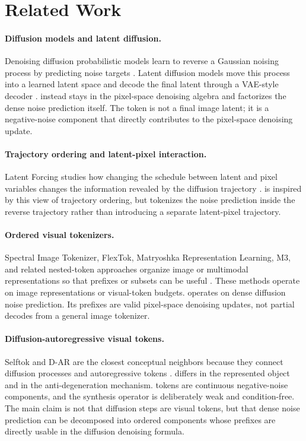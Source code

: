 \section{Related Work}

\paragraph{Diffusion models and latent diffusion.}
Denoising diffusion probabilistic models learn to reverse a Gaussian noising
process by predicting noise targets \citep{ho2020denoising}. Latent diffusion
models move this process into a learned latent space and decode the final latent
through a VAE-style decoder \citep{rombach2022latentdiffusion}. \method{}
instead stays in the pixel-space denoising algebra and factorizes the dense
noise prediction itself. The \method{} token is not a final image latent; it is a
negative-noise component that directly contributes to the pixel-space
denoising update.

\paragraph{Trajectory ordering and latent-pixel interaction.}
Latent Forcing studies how changing the schedule between latent and pixel
variables changes the information revealed by the diffusion trajectory
\citep{baade2026latentforcing}. \method{} is inspired by this view of trajectory
ordering, but tokenizes the noise prediction inside the reverse trajectory
rather than introducing a separate latent-pixel trajectory.

\paragraph{Ordered visual tokenizers.}
Spectral Image Tokenizer, FlexTok, Matryoshka Representation Learning, M3, and
related nested-token approaches organize image or multimodal representations so
that prefixes or subsets can be useful
\citep{esteves2025spectral,bachmann2025flextok,kusupati2024matryoshka,cai2024matryoshkamultimodal}.
These methods operate on image representations or visual-token budgets.
\method{} operates on dense diffusion noise prediction. Its prefixes are valid
pixel-space denoising updates, not partial decodes from a general image
tokenizer.

\paragraph{Diffusion-autoregressive visual tokens.}
Selftok and D-AR are the closest conceptual neighbors because they connect
diffusion processes and autoregressive tokens \citep{wang2025selftok,gao2025dar}.
\method{} differs in the represented object and in the anti-degeneration
mechanism. \method{} tokens are continuous negative-noise components,
and the synthesis operator is deliberately weak and condition-free. The main
claim is not that diffusion steps are visual tokens, but that dense noise
prediction can be decomposed into ordered components whose prefixes are directly
usable in the diffusion denoising formula.
